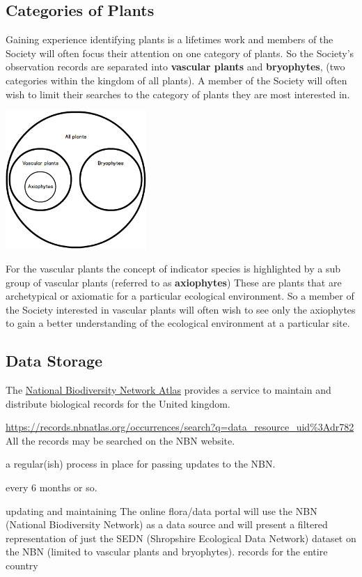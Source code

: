 \documentclass[a4paper,12pt,landscape]{article}
\begin{document}
\begin{multicols*}{2}
  \subsection{Categories of Plants}
  Gaining experience identifying plants is a lifetimes work
  and members of the Society will often
  focus their attention on one category of plants.
  So the Society's observation records
  are separated into \textbf{vascular plants} and \textbf{bryophytes},
  (two categories within the kingdom of all plants).
  A member of the Society will often wish to limit their searches to the
  category of plants they are most interested in.

  \includegraphics[width=0.4\textwidth,height=\textheight,keepaspectratio]{./wireframes/Categories.png}

  For the vascular plants
  the concept of indicator species is highlighted
  by a sub group of vascular plants
  (referred to as \textbf{axiophytes})
  These are plants that are archetypical or axiomatic for a particular ecological environment.
  So a member of the Society interested in vascular plants
  will often wish to see only the axiophytes
  to gain a better understanding of the ecological environment
  at a particular site.

  \subsection{Data Storage}
  The \href{https://nbnatlas.org/}{National Biodiversity Network Atlas}
  provides a service to maintain and distribute biological records
  for the United kingdom.


  \url{https://records.nbnatlas.org/occurrences/search?q=data_resource_uid%3Adr782}
  All the records may be searched on the NBN website. 

  a regular(ish) process in place for passing updates to the NBN.  
  
   every 6 months or so. 
   
  updating and maintaining
  The online flora/data portal will use the NBN (National Biodiversity Network) 
  as a data source and will present a filtered representation of just the SEDN 
  (Shropshire Ecological Data Network) dataset on the NBN (limited to vascular plants and bryophytes). 
  records for the entire country


\end{multicols*}
\end{document}
